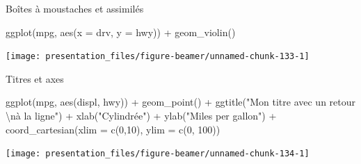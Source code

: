 \documentclass[12pt,handout,ignorenonframetext,]{beamer}
\newenvironment{Shaded}{}{}
\newcommand{\KeywordTok}[1]{\textcolor[rgb]{0.00,0.00,1.00}{#1}}
\newcommand{\DataTypeTok}[1]{#1}
\newcommand{\DecValTok}[1]{#1}
\newcommand{\CharTok}[1]{\textcolor[rgb]{0.00,0.50,0.50}{#1}}
\newcommand{\StringTok}[1]{\textcolor[rgb]{0.00,0.50,0.50}{#1}}
\newcommand{\OperatorTok}[1]{#1}
\newcommand{\NormalTok}[1]{#1}
\renewenvironment{Shaded}{\begin{snugshade}}{\end{snugshade}}
\begin{document}
\begin{frame}[fragile]{Boîtes à moustaches et assimilés}

\footnotesize \center

\begin{Shaded}
\begin{Highlighting}[]
\KeywordTok{ggplot}\NormalTok{(mpg, }\KeywordTok{aes}\NormalTok{(}\DataTypeTok{x =}\NormalTok{ drv, }\DataTypeTok{y =}\NormalTok{ hwy)) }\OperatorTok{+}\StringTok{ }
\StringTok{  }\KeywordTok{geom_violin}\NormalTok{()}
\end{Highlighting}
\end{Shaded}

\texttt{[image: presentation\_files/figure-beamer/unnamed-chunk-133-1]}

\end{frame}

\begin{frame}[fragile]{Titres et axes}

\footnotesize \center

\begin{Shaded}
\begin{Highlighting}[]
\KeywordTok{ggplot}\NormalTok{(mpg, }\KeywordTok{aes}\NormalTok{(displ, hwy)) }\OperatorTok{+}\StringTok{ }\KeywordTok{geom_point}\NormalTok{() }\OperatorTok{+}\StringTok{ }
\StringTok{  }\KeywordTok{ggtitle}\NormalTok{(}\StringTok{"Mon titre avec un retour }\CharTok{\textbackslash{}n}\StringTok{à la ligne"}\NormalTok{) }\OperatorTok{+}
\StringTok{  }\KeywordTok{xlab}\NormalTok{(}\StringTok{"Cylindrée"}\NormalTok{) }\OperatorTok{+}\StringTok{ }\KeywordTok{ylab}\NormalTok{(}\StringTok{"Miles per gallon"}\NormalTok{) }\OperatorTok{+}
\StringTok{  }\KeywordTok{coord_cartesian}\NormalTok{(}\DataTypeTok{xlim =} \KeywordTok{c}\NormalTok{(}\DecValTok{0}\NormalTok{,}\DecValTok{10}\NormalTok{), }\DataTypeTok{ylim =} \KeywordTok{c}\NormalTok{(}\DecValTok{0}\NormalTok{, }\DecValTok{100}\NormalTok{))}
\end{Highlighting}
\end{Shaded}

\texttt{[image: presentation\_files/figure-beamer/unnamed-chunk-134-1]}

\end{frame}
\end{document}
